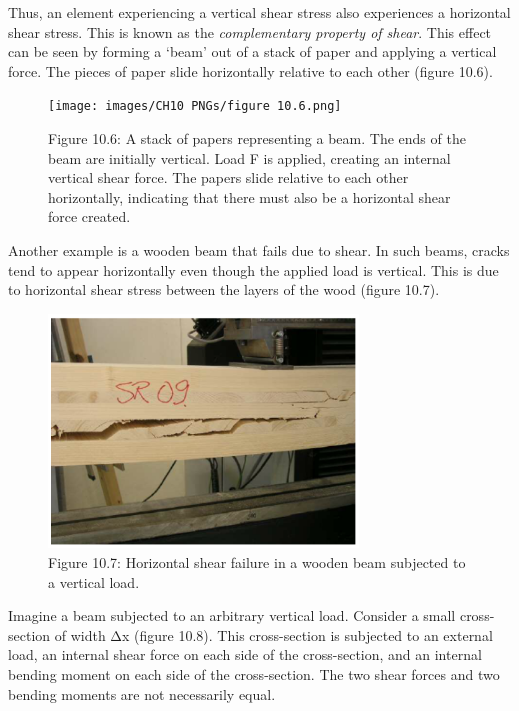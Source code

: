 \documentclass[
  letterpaper,
  DIV=11,
  numbers=noendperiod]{scrreprt}
\theoremstyle{definition}
\theoremstyle{remark}
\begin{document}
Thus, an element experiencing a vertical shear stress also experiences a
horizontal shear stress. This is known as the \emph{complementary
property of shear}. This effect can be seen by forming a `beam' out of a
stack of paper and applying a vertical force. The pieces of paper slide
horizontally relative to each other (figure 10.6).

\begin{figure}[H]

{\centering \texttt{[image: images/CH10 PNGs/figure 10.6.png]}

}

\caption{Figure 10.6: A stack of papers representing a beam. The ends of
the beam are initially vertical. Load F is applied, creating an internal
vertical shear force. The papers slide relative to each other
horizontally, indicating that there must also be a horizontal shear
force created.}

\end{figure}%

Another example is a wooden beam that fails due to shear. In such beams,
cracks tend to appear horizontally even though the applied load is
vertical. This is due to horizontal shear stress between the layers of
the wood (figure 10.7).

\begin{figure}[H]

{\centering \includegraphics[width=3.23958in,height=\textheight]{images/CH10 PNGs/figure 10.7.png}

}

\caption{Figure 10.7: Horizontal shear failure in a wooden beam
subjected to a vertical load.}

\end{figure}%

Imagine a beam subjected to an arbitrary vertical load. Consider a small
cross-section of width Δx (figure 10.8). This cross-section is subjected
to an external load, an internal shear force on each side of the
cross-section, and an internal bending moment on each side of the
cross-section. The two shear forces and two bending moments are not
necessarily equal.
\end{document}
